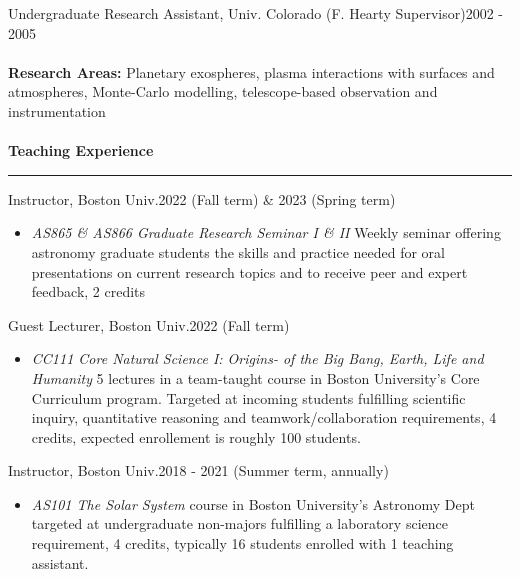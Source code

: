 \documentclass[12pt]{report}
\begin{document}
\noindent Undergraduate Research Assistant, Univ. Colorado (F. Hearty Supervisor)\hfill 2002 - 2005\\
\vspace{1 mm}\\
\textbf{Research Areas:} Planetary exospheres, plasma interactions with surfaces and atmospheres, Monte-Carlo modelling, telescope-based observation and instrumentation\\
\vspace{2 mm}\\
\bf{Teaching Experience}\rm \hspace*{\fill} \\
\rule{\textwidth}{1pt}
\noindent Instructor, Boston Univ.\hfill 2022 (Fall term) \& 2023 (Spring term)
   \begin{itemize} \itemsep -2pt %
   \item \textit{AS865 \& AS866 Graduate Research Seminar I \& II} Weekly seminar offering astronomy graduate students the skills and practice needed for oral presentations on current research topics and to receive peer and expert feedback, 2 credits
 \end{itemize}
\noindent Guest Lecturer, Boston Univ.\hfill 2022 (Fall term)
   \begin{itemize} \itemsep -2pt %
   \item \textit{CC111 Core Natural Science I: Origins- of the Big Bang, Earth, Life and Humanity} 5 lectures in a team-taught course in Boston University's Core Curriculum program. Targeted at incoming students fulfilling scientific inquiry, quantitative reasoning and teamwork/collaboration requirements, 4 credits, expected enrollement is roughly 100 students.
 \end{itemize}
\noindent Instructor, Boston Univ.\hfill 2018 - 2021 (Summer term, annually)
   \begin{itemize} \itemsep -2pt %
   \item \textit{AS101 The Solar System} course in Boston University's Astronomy Dept targeted at undergraduate
non-majors fulfilling a laboratory science requirement, 4 credits, typically 16 students enrolled with 1 teaching assistant.
 \end{itemize}
\end{document}
